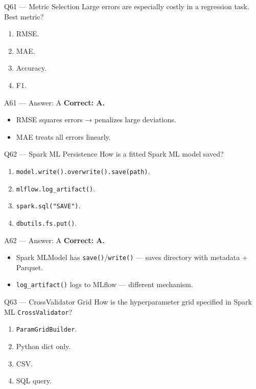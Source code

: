 \documentclass[aspectratio=169,10pt]{beamer}
\begin{document}
	\begin{frame}{Q61 — Metric Selection}
		Large errors are especially costly in a regression task. Best metric?
		\begin{enumerate}[label=\Alph*.]
			\item RMSE.
			\item MAE.
			\item Accuracy.
			\item F1.
		\end{enumerate}
	\end{frame}
	
	\begin{frame}{A61 — Answer: A}
		\textbf{Correct: A.}
		\begin{itemize}
			\item RMSE squares errors → penalizes large deviations.
			\item MAE treats all errors linearly.
		\end{itemize}
	\end{frame}
	
	\begin{frame}{Q62 — Spark ML Persistence}
		How is a fitted Spark ML model saved?
		\begin{enumerate}[label=\Alph*.]
			\item \texttt{model.write().overwrite().save(path)}.
			\item \texttt{mlflow.log\_artifact()}.
			\item \texttt{spark.sql("SAVE")}.
			\item \texttt{dbutils.fs.put()}.
		\end{enumerate}
	\end{frame}
	
	\begin{frame}{A62 — Answer: A}
		\textbf{Correct: A.}
		\begin{itemize}
			\item Spark MLModel has \texttt{save()}/\texttt{write()} — saves directory with metadata + Parquet.
			\item \texttt{log\_artifact()} logs to MLflow — different mechanism.
		\end{itemize}
	\end{frame}
	
	\begin{frame}{Q63 — CrossValidator Grid}
		How is the hyperparameter grid specified in Spark ML \texttt{CrossValidator}?
		\begin{enumerate}[label=\Alph*.]
			\item \texttt{ParamGridBuilder}.
			\item Python dict only.
			\item CSV.
			\item SQL query.
		\end{enumerate}
	\end{frame}
	
\end{document}

